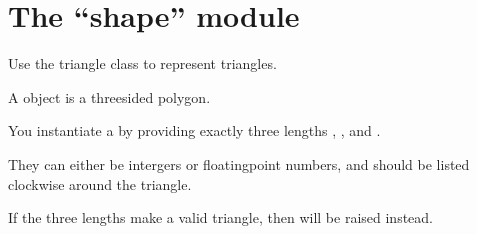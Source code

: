 \documentclass[letterpaper,10pt,english]{sphinxmanual}
\begin{document}
\section{The “shape” module}
\label{\detokenize{api:module-trianglelib.shape}}\label{\detokenize{api:the-shape-module}}
Use the triangle class to represent triangles.

\begin{fulllineitems}
\label{\detokenize{api:trianglelib.shape.Triangle}}
A {\hyperref[\detokenize{api:trianglelib.shape.Triangle}]{}} object is a three\sphinxhyphen{}sided polygon.

You instantiate a {\hyperref[\detokenize{api:trianglelib.shape.Triangle}]{}} by providing exactly three lengths , , and .

They can either be intergers or floating\sphinxhyphen{}point numbers, and should be listed clockwise around the triangle.

If the three lengths  make a valid triangle, then  will be raised instead.

\begin{sphinxVerbatim}[commandchars=\\\{\}]
   
    
\end{sphinxVerbatim}


\end{fulllineitems}
\end{document}
